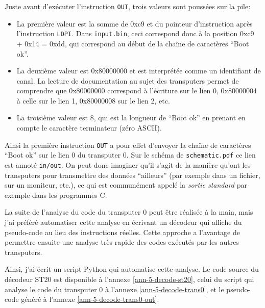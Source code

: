 \documentclass[a4paper,10pt]{article}
\begin{document}
Juste avant d'exécuter l'instruction \texttt{OUT}, trois valeurs sont poussées sur la pile:
\begin{itemize}
  \item La première valeur est la somme de 0xc9 et du pointeur d'instruction après l'instruction \texttt{LDPI}. Dans \texttt{input.bin}, ceci correspond donc à la position 0xc9 + 0x14 = 0xdd, qui correspond au début de la chaîne de caractères ``Boot ok''.
  \item La deuxième valeur est 0x80000000 et est interprétée comme un identifiant de canal. La lecture de documentation au sujet des transputers permet de comprendre que 0x80000000 correspond à l'écriture sur le lien 0, 0x80000004 à celle sur le lien 1, 0x80000008 sur le lien 2, etc.
  \item La troisième valeur est 8, qui est la longueur de ``Boot ok'' en prenant en compte le caractère terminateur (zéro ASCII).
\end{itemize}

Ainsi la première instruction \texttt{OUT} a pour effet d'envoyer la chaîne de caractères ``Boot ok'' sur le lien 0 du transputer 0.
Sur le schéma de \texttt{schematic.pdf} ce lien est annoté \texttt{in/out}.
On peut donc imaginer qu'il s'agit de la manière qu'ont les transputers pour transmettre des données ``ailleurs'' (par exemple dans un fichier, sur un moniteur, etc.), ce qui est communément appelé la \emph{sortie standard} par exemple dans les programmes C.

La suite de l'analyse du code du transputer 0 peut être réalisée à la main, mais j'ai préféré automatiser cette analyse en écrivant un décodeur qui affiche du pseudo-code au lieu des instructions réelles.
Cette approche a l'avantage de permettre ensuite une analyse très rapide des codes exécutés par les autres transputers.

Ainsi, j'ai écrit un script Python qui automatise cette analyse. Le code source du décodeur ST20 est disponible à l'annexe \ref{ann-5-decode-st20}, celui du script qui analyse le code du transputer 0 à l'annexe \ref{ann-5-decode-trans0}, et le pseudo-code généré à l'annexe \ref{ann-5-decode-trans0-out}.
\end{document}
